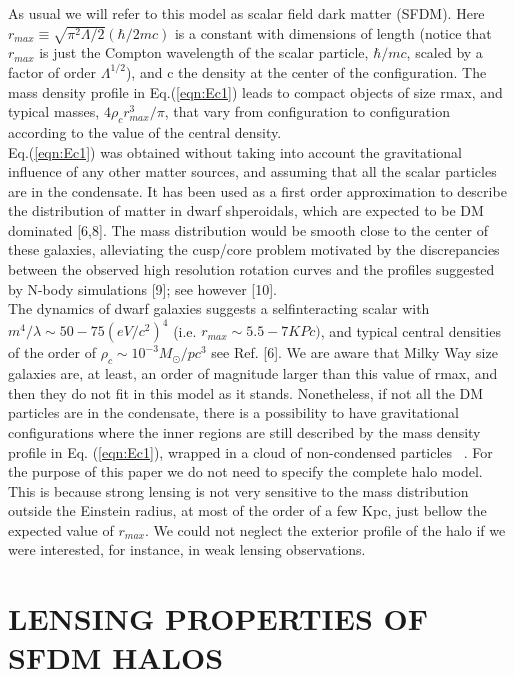\documentclass[9.5pt, twocolumn]{article}
\begin{document}
As usual we will refer to this model as scalar field dark
matter (SFDM). Here $r_{max}\equiv \sqrt{\pi^2\Lambda/2}(\hbar/2mc)$ is a constant
with dimensions of length (notice that $r_{max}$ is just
the Compton wavelength of the scalar particle, $\hbar/mc$,
scaled by a factor of order $\Lambda^{1/2}$), and c the density at
the center of the configuration. The mass density profile
in Eq.(\ref{eqn:Ec1}) leads to compact objects of size rmax, and typical
masses, $4\rho_cr^3_{max}/\pi$, that vary from configuration to
configuration according to the value of the central density.\\ Eq.(\ref{eqn:Ec1}) was obtained without taking into account the
gravitational influence of any other matter sources, and
assuming that all the scalar particles are in the condensate.
It has been used as a first order approximation to
describe the distribution of matter in dwarf shperoidals,
which are expected to be DM dominated [6,8]. The mass
distribution would be smooth close to the center of these
galaxies, alleviating the cusp/core problem motivated by
the discrepancies between the observed high resolution
rotation curves and the profiles suggested by N-body simulations
[9]; see however [10].\\
The dynamics of dwarf galaxies suggests a selfinteracting
scalar with $m^4/\lambda\sim 50-75(eV/c^2)^4$ (i.e.
$r_{max} \sim 5.5-7KPc)$, and typical central densities of the
order of $\rho_c\sim 10^{-3}M_{\odot}/pc^3$ see Ref. [6]. We are aware
that Milky Way size galaxies are, at least, an order of
magnitude larger than this value of rmax, and then they
do not fit in this model as it stands. Nonetheless, if
not all the DM particles are in the condensate, there is
a possibility to have gravitational configurations where
the inner regions are still described by the mass density
profile in Eq. (\ref{eqn:Ec1}), wrapped in a cloud of non-condensed
particles ~\cite{Harko_2011}. For the purpose of this paper we do not
need to specify the complete halo model. This is because
strong lensing is not very sensitive to the mass distribution
outside the Einstein radius, at most of the order of
a few Kpc, just bellow the expected value of $r_{max}$. We
could not neglect the exterior profile of the halo if we were
interested, for instance, in weak lensing observations.


\section[II]{\centering \small LENSING PROPERTIES OF SFDM HALOS}
\end{document}
